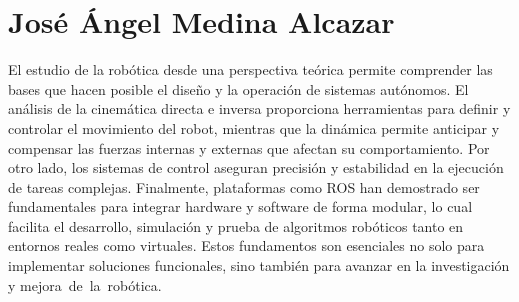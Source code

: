 \section{José Ángel Medina Alcazar}
El estudio de la robótica desde una perspectiva teórica permite comprender las bases que hacen posible el diseño y la operación de sistemas autónomos. El análisis de la cinemática directa e inversa proporciona herramientas para definir y controlar el movimiento del robot, mientras que la dinámica permite anticipar y compensar las fuerzas internas y externas que afectan su comportamiento. Por otro lado, los sistemas de control aseguran precisión y estabilidad en la ejecución de tareas complejas. Finalmente, plataformas como ROS han demostrado ser fundamentales para integrar hardware y software de forma modular, lo cual facilita el desarrollo, simulación y prueba de algoritmos robóticos tanto en entornos reales como virtuales. Estos fundamentos son esenciales no solo para implementar soluciones funcionales, sino también para avanzar en la investigación y mejora de la robótica.